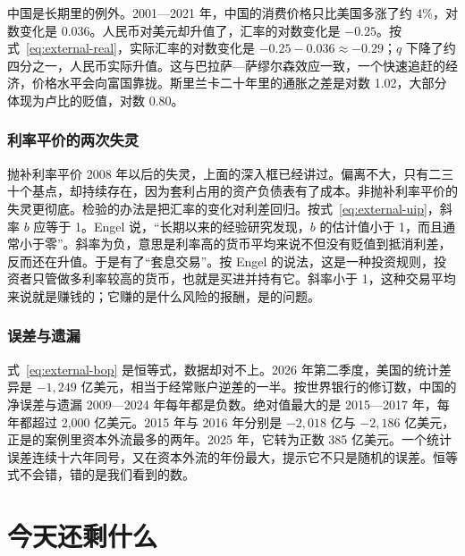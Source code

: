 中国是长期里的例外。2001—2021 年，中国的消费价格只比美国多涨了约 4\%，对数变化是 0.036。人民币对美元却升值了，汇率的对数变化是 $-0.25$。按式~\eqref{eq:external-real}，实际汇率的对数变化是 $-0.25-0.036\approx-0.29$；$q$ 下降了约四分之一，人民币实际升值。这与巴拉萨—萨缪尔森效应一致，一个快速追赶的经济，价格水平会向富国靠拢。斯里兰卡二十年里的通胀之差是对数 1.02，大部分体现为卢比的贬值，对数 0.80\cite{wdi2026}。

\subsubsection{利率平价的两次失灵}
抛补利率平价 2008 年以后的失灵，上面的深入框已经讲过。偏离不大，只有二三十个基点，却持续存在，因为套利占用的资产负债表有了成本。非抛补利率平价的失灵更彻底。检验的办法是把汇率的变化对利差回归。按式~\eqref{eq:external-uip}，斜率 $b$ 应等于 1。Engel 说，“长期以来的经验研究发现，$b$ 的估计值小于 1，而且通常小于零”\cite{engel2014}。斜率为负，意思是利率高的货币平均来说不但没有贬值到抵消利差，反而还在升值。于是有了“套息交易”。按 Engel 的说法，这是一种投资规则，投资者只管做多利率较高的货币，也就是买进并持有它\cite{engel2014}。斜率小于 1，这种交易平均来说就是赚钱的；它赚的是什么风险的报酬，是的问题。

\subsubsection{误差与遗漏}
式~\eqref{eq:external-bop} 是恒等式，数据却对不上。2026 年第二季度，美国的统计差异是 $-1,249$ 亿美元，相当于经常账户逆差的一半\cite{bea2026q2}。按世界银行的修订数，中国的净误差与遗漏 2009—2024 年每年都是负数。绝对值最大的是 2015—2017 年，每年都超过 2,000 亿美元。2015 年与 2016 年分别是 $-2,018$ 亿与 $-2,186$ 亿美元，正是的案例里资本外流最多的两年。2025 年，它转为正数 385 亿美元\cite{wdi2026}。一个统计误差连续十六年同号，又在资本外流的年份最大，提示它不只是随机的误差。恒等式不会错，错的是我们看到的数。

\section{今天还剩什么}\label{sec:external-legacy}

